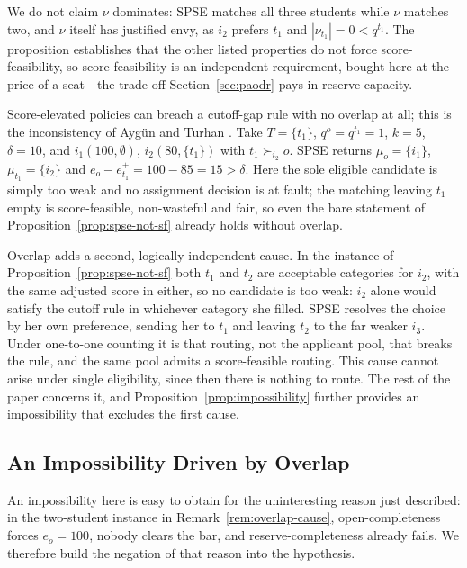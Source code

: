 \documentclass[runningheads]{llncs}
\begin{document}
We do not claim $\nu$ dominates: SPSE matches all three students while $\nu$ matches two, and $\nu$ itself has justified envy, as $i_2$ prefers $t_1$ and $|\nu_{t_1}|=0<q^{t_1}$. The proposition establishes that the other listed properties do not force score-feasibility, so score-feasibility is an independent requirement, bought here at the price of a seat---the trade-off Section~\ref{sec:paodr} pays in reserve capacity.

\begin{nremark}
\label{rem:overlap-cause}
Score-elevated policies can breach a cutoff-gap rule with no overlap at all; this is the inconsistency of Ayg\"un and Turhan \cite{AyTu23b}. Take $T=\{t_1\}$, $q^o=q^{t_1}=1$, $k=5$, $\delta=10$, and $i_1(100,\emptyset)$, $i_2(80,\{t_1\})$ with $t_1\succ_{i_2}o$. SPSE returns $\mu_o=\{i_1\}$, $\mu_{t_1}=\{i_2\}$ and $e_o-e_{t_1}^+=100-85=15>\delta$. Here the sole eligible candidate is simply too weak and no assignment decision is at fault; the matching leaving $t_1$ empty is score-feasible, non-wasteful and fair, so even the bare statement of Proposition~\ref{prop:spse-not-sf} already holds without overlap.

Overlap adds a second, logically independent cause. In the instance of Proposition~\ref{prop:spse-not-sf} both $t_1$ and $t_2$ are acceptable categories for $i_2$, with the same adjusted score in either, so no candidate is too weak: $i_2$ alone would satisfy the cutoff rule in whichever category she filled. SPSE resolves the choice by her own preference, sending her to $t_1$ and leaving $t_2$ to the far weaker $i_3$. Under one-to-one counting it is that routing, not the applicant pool, that breaks the rule, and the same pool admits a score-feasible routing. This cause cannot arise under single eligibility, since then there is nothing to route. The rest of the paper concerns it, and Proposition~\ref{prop:impossibility} further provides an impossibility that excludes the first cause.
\end{nremark}

\subsection{An Impossibility Driven by Overlap}

An impossibility here is easy to obtain for the uninteresting reason just described: in the two-student instance in Remark~\ref{rem:overlap-cause}, open-completeness forces $e_o=100$, nobody clears the bar, and reserve-completeness already fails. We therefore build the negation of that reason into the hypothesis.
\end{document}
